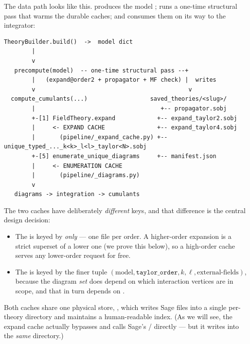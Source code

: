 The data path looks like this.  produces the model
;  runs a one-time structural pass that
warms the durable caches; and  consumes them
on its way to the integrator:

\begin{lstlisting}[style=console]
TheoryBuilder.build()  ->  model dict
        |
        v
   precompute(model)  -- one-time structural pass --+
        |   (expand@order2 + propagator + MF check) |  writes
        v                                            v
  compute_cumulants(...)                  saved_theories/<slug>/
        |                                    +-- propagator.sobj
        +-[1] FieldTheory.expand            +-- expand_taylor2.sobj
        |     <- EXPAND CACHE               +-- expand_taylor4.sobj
        |       (pipeline/_expand_cache.py) +-- unique_typed_..._k<k>_l<l>_taylor<N>.sobj
        +-[5] enumerate_unique_diagrams     +-- manifest.json
        |     <- ENUMERATION CACHE
        |       (pipeline/_diagrams.py)
        v
   diagrams -> integration -> cumulants
\end{lstlisting}

The two caches have deliberately \emph{different} keys, and that difference is
the central design decision:

\begin{itemize}
  \item The  is keyed by  \emph{only}
        --- one file per order. A higher-order expansion is a strict superset
        of a lower one (we prove this below), so a high-order cache serves any
        lower-order request for free.
  \item The  is keyed by the finer tuple
        $(\text{model}, \texttt{taylor\_order}, k, \ell,
        \text{external-fields})$, because the diagram \emph{set} does depend on
        which interaction vertices are in scope, and that in turn depends on
        .
\end{itemize}

Both caches share one physical store, , which writes Sage
 files into a single per-theory directory and maintains a
human-readable  index. (As we will see, the expand cache
actually bypasses  and calls Sage's /
directly --- but it writes into the \emph{same} directory.)

